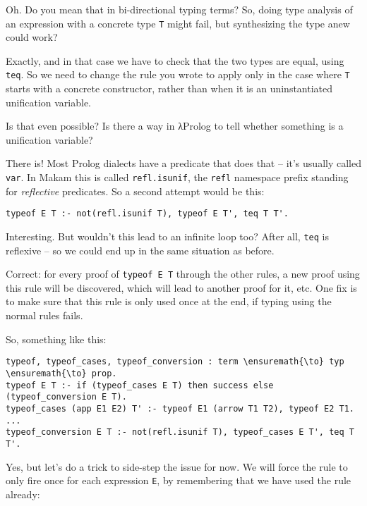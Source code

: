 \heroSTUDENT{} Oh. Do you mean that in bi-directional typing terms? So, doing
type analysis of an expression with a concrete type \texttt{T} might
fail, but synthesizing the type anew could work?

\heroADVISOR{} Exactly, and in that case we have to check that the two types
are equal, using \texttt{teq}. So we need to change the rule you wrote
to apply only in the case where \texttt{T} starts with a concrete
constructor, rather than when it is an uninstantiated unification
variable.

\heroSTUDENT{} Is that even possible? Is there a way in \foreignlanguage{greek}{λ}Prolog to tell
whether something is a unification variable?

\heroADVISOR{} There is! Most Prolog dialects have a predicate that does that
-- it's usually called \texttt{var}. In Makam this is called
\texttt{refl.isunif}, the \texttt{refl} namespace prefix standing for
\emph{reflective} predicates. So a second attempt would be this:

\begin{verbatim}
typeof E T :- not(refl.isunif T), typeof E T', teq T T'.
\end{verbatim}

\heroSTUDENT{} Interesting. But wouldn't this lead to an infinite loop too?
After all, \texttt{teq} is reflexive -- so we could end up in the same
situation as before.

\heroADVISOR{} Correct: for every proof of
\texttt{typeof\ E\ T\textquotesingle{}} through the other rules, a new
proof using this rule will be discovered, which will lead to another
proof for it, etc. One fix is to make sure that this rule is only used
once at the end, if typing using the normal rules fails.

\heroSTUDENT{} So, something like this:

\begin{verbatim}
typeof, typeof_cases, typeof_conversion : term \ensuremath{\to} typ \ensuremath{\to} prop.
typeof E T :- if (typeof_cases E T) then success else (typeof_conversion E T).
typeof_cases (app E1 E2) T' :- typeof E1 (arrow T1 T2), typeof E2 T1.
...
typeof_conversion E T :- not(refl.isunif T), typeof_cases E T', teq T T'.
\end{verbatim}

\heroADVISOR{} Yes, but let's do a trick to side-step the issue for now. We
will force the rule to only fire once for each expression \texttt{E}, by
remembering that we have used the rule already:

